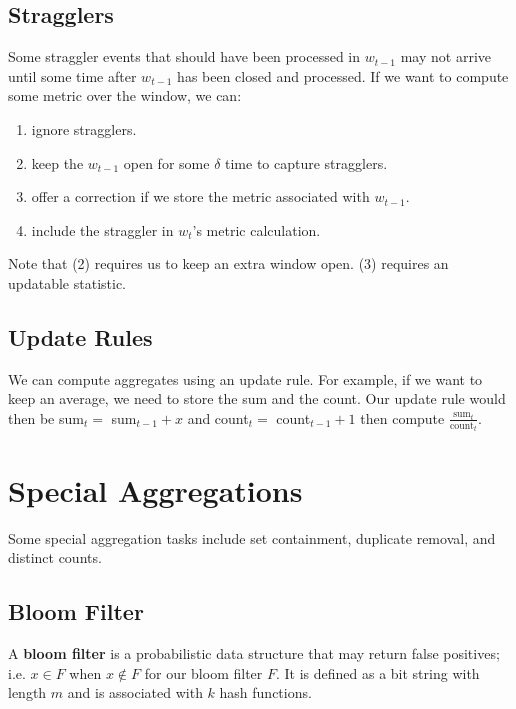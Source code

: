 \documentclass{report}
\renewcommand{\bf}[1]{\textbf{{#1}}}
\begin{document}
\subsection{Stragglers}
Some straggler events that should have been processed in $w_{t - 1}$ may not
arrive until some time after $w_{t - 1}$ has been closed and processed. If we
want to compute some metric over the window, we can:
\begin{enumerate}[label=(\arabic*)]
    \item ignore stragglers.
    \item keep the $w_{t - 1}$ open for some $\delta$ time to capture stragglers.
    \item offer a correction if we store the metric associated with $w_{t - 1}$.
    \item include the straggler in $w_t$'s metric calculation.
\end{enumerate}

Note that (2) requires us to keep an extra window open. (3) requires an
updatable statistic.

\subsection{Update Rules}
We can compute aggregates using an update rule. For example, if we want to keep
an average, we need to store the sum and the count. Our update rule would then
be sum$_t =$ sum$_{t - 1} + x$ and count$_t =$ count$_{t - 1} + 1$ then compute
$\frac{\text{sum}_t}{\text{count}_t}$.

\section{Special Aggregations}
Some special aggregation tasks include set containment, duplicate removal, and
distinct counts.

\subsection{Bloom Filter}
A \bf{bloom filter} is a probabilistic data structure that may return false
positives; i.e. $x \in F$ when $x \not\in F$ for our bloom filter $F$. It is
defined as a bit string with length $m$ and is associated with $k$ hash
functions.
\end{document}
